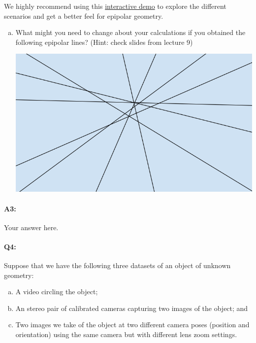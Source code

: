 We highly recommend using this \href{https://browncsci1430.github.io/webpage/demos/stereo_camera_visualization/index.html}{interactive demo} to explore the different scenarios and get a better feel for epipolar geometry.
\begin{enumerate}[(c)]
\item What might you need to change about your calculations if you obtained the following epipolar lines? (Hint: check slides from lecture 9)

\includegraphics[width = 0.25\linewidth]{q3-c.PNG}
\end{enumerate}


\paragraph{A3:} Your answer here.






\pagebreak
\paragraph{Q4:}
Suppose that we have the following three datasets of an object of unknown geometry:
\begin{enumerate}[(a)]
\item A video circling the object;
\item An stereo pair of calibrated cameras capturing two images of the object; and
\item Two images we take of the object at two different camera poses (position and orientation) using the same camera but with different lens zoom settings.
\end{enumerate}

